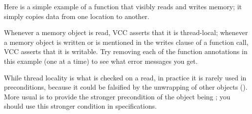 Here is a simple example of a function that visibly reads and writes
memory; it simply copies data from one location to another.



Whenever a memory object is read, VCC asserts that it is
thread-local; whenever a memory object is written or is
mentioned in the writes clause of a function call, VCC asserts that it
is writable. Try removing each of the function annotations in
this example (one at a time) to see what error messages you get.

While thread locality is what is checked on a read, in practice it is
rarely used in preconditions, because it could be falsified by the
unwrapping of other objects (). 
More usual is to provide the stronger precondition of the object being
\vcc{\unwrapped}; you should use this stronger condition in specifications.




